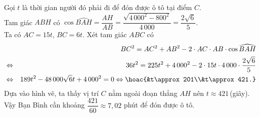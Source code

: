 \begin{bt}
{\begin{center}
\begin{tikzpicture}[>=stealth,line join=round,line cap=round,font=\footnotesize,scale=0.5]
			\end{tikzpicture}
		\end{center}
		Gọi $t$ là thời gian người đó phải đi để đón được ô tô tại điểm $C$.\\
		Tam giác $ABH$ có $\cos\widehat{BAH}=\dfrac{AH}{AB}=\dfrac{\sqrt{4\,000^2-800^2}}{4\,000}=\dfrac{2\sqrt{6}}{5}$.\\
	Ta có $AC=15t$, $BC=6t$. Xét tam giác $ABC$ có
	\begin{eqnarray*}
		&&BC^2=AC^2+AB^2-2\cdot AC\cdot AB\cdot \cos\widehat{BAH}\\
		&\Leftrightarrow&36t^2=225t^2+4\,000^2-2\cdot15t\cdot4\,000\cdot\dfrac{2\sqrt{6}}{5}\\
		&\Leftrightarrow&189t^2-48\,000\sqrt{6}t+4\,000^2=0\Leftrightarrow\hoac{&t\approx201\\&t\approx421.}
	\end{eqnarray*}
Dựa vào hình vẽ, ta thấy vị trí $C$ nằm ngoài đoạn thẳng $AH$ nên $t\approx421$\,(giây).\\
Vậy Bạn Bình cần khoảng $\dfrac{421}{60}\approx7{,}02$ phút để đón được ô tô.}
\end{bt}

